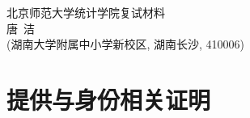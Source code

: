 \documentclass[UFT8]{ctexart}%
\begin{document}
\thispagestyle{empty} %
\vspace*{3cm}
\begin{center}
{{\LARGE\heiti 北京师范大学统计学院复试材料}\\[0.6cm]
{\normalsize 唐\ 洁}\\[0.1cm]
{\small(湖南大学附属中小学新校区, 湖南长沙, 410006)}}
\end{center}

\clearpage%
\tableofcontents%
\thispagestyle{empty} %

\clearpage%
\setcounter{page}{1}%

%
%
%
%
%
%
%
%


%
%

\section{提供与身份相关证明}
\end{document}
